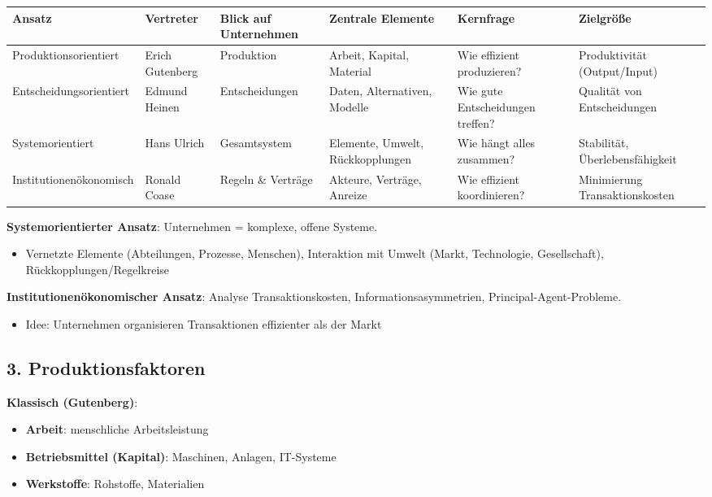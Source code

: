 \documentclass[11pt, a4paper]{article}
\begin{document}
{\small
\begin{tabularx}{\linewidth}{XXXXXX}
\hline
\rowcolor{tableheadbg}
{\color{white}\textbf{Ansatz}} & {\color{white}\textbf{Vertreter}} & {\color{white}\textbf{Blick auf Unternehmen}} & {\color{white}\textbf{Zentrale Elemente}} & {\color{white}\textbf{Kernfrage}} & {\color{white}\textbf{Zielgröße}} \\[2pt]
\hline
\endhead
\hline
\endfoot
Produktionsorientiert & Erich Gutenberg & Produktion & Arbeit, Kapital, Material & Wie effizient produzieren? & Produktivität (Output/Input) \\
Entscheidungsorientiert & Edmund Heinen & Entscheidungen & Daten, Alternativen, Modelle & Wie gute Entscheidungen treffen? & Qualität von Entscheidungen \\
Systemorientiert & Hans Ulrich & Gesamtsystem & Elemente, Umwelt, Rückkopplungen & Wie hängt alles zusammen? & Stabilität, Überlebensfähigkeit \\
Institutionenökonomisch & Ronald Coase & Regeln \& Verträge & Akteure, Verträge, Anreize & Wie effizient koordinieren? & Minimierung Transaktionskosten \\
\end{tabularx}
}


\textbf{Systemorientierter Ansatz}: Unternehmen = komplexe, offene Systeme.

\begin{itemize}
  \item Vernetzte Elemente (Abteilungen, Prozesse, Menschen), Interaktion mit Umwelt (Markt, Technologie, Gesellschaft), Rückkopplungen/Regelkreise
\end{itemize}

\textbf{Institutionenökonomischer Ansatz}: Analyse Transaktionskosten, Informationsasymmetrien, Principal-Agent-Probleme.

\begin{itemize}
  \item Idee: Unternehmen organisieren Transaktionen effizienter als der Markt
\end{itemize}


\subsection{3. Produktionsfaktoren}

\textbf{Klassisch (Gutenberg)}:

\begin{itemize}
  \item \textbf{Arbeit}: menschliche Arbeitsleistung
  \item \textbf{Betriebsmittel (Kapital)}: Maschinen, Anlagen, IT-Systeme
  \item \textbf{Werkstoffe}: Rohstoffe, Materialien
\end{itemize}
\end{document}
